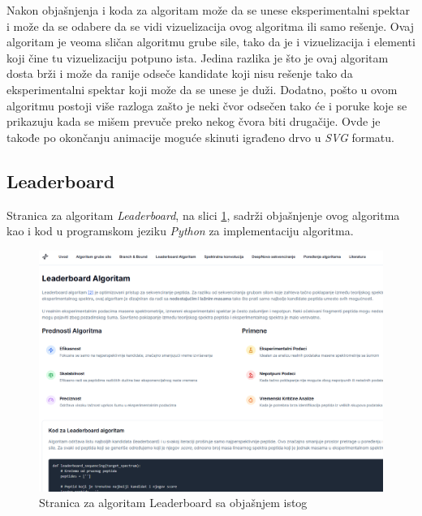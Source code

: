 \documentclass[12pt,oneside]{memoir}
\begin{document}
Nakon objašnjenja i koda za algoritam može da se unese eksperimentalni spektar i može da se odabere da se vidi vizuelizacija ovog algoritma ili samo rešenje. Ovaj algoritam je veoma sličan algoritmu grube sile, tako da je i vizuelizacija i elementi koji čine tu vizuelizaciju potpuno ista. Jedina razlika je što je ovaj algoritam dosta brži i može da ranije odseče kandidate koji nisu rešenje tako da eksperimentalni spektar koji može da se unese je duži. Dodatno, pošto u ovom algoritmu postoji više razloga zašto je neki čvor odsečen tako će i poruke koje se prikazuju kada se mišem prevuče preko nekog čvora biti drugačije. Ovde je takođe po okončanju animacije moguće skinuti igrađeno drvo u \emph{SVG} formatu.

\subsection{Leaderboard}
Stranica za algoritam \emph{Leaderboard}, na slici \ref{fig:leaderboard_1}, sadrži objašnjenje ovog algoritma kao i kod u programskom jeziku \emph{Python} za implementaciju algoritma.
\begin{figure}[H]
\centering
\includegraphics[width=1\textwidth]{images/leaderboard_1.png}
\caption{Stranica za algoritam Leaderboard sa objašnjem istog}
\label{fig:leaderboard_1}
\end{figure}
\end{document}
